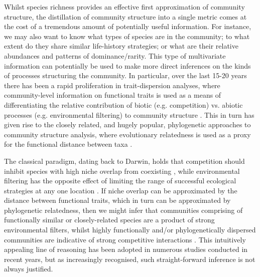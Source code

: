 Whilst species richness provides an effective first approximation of community structure, the distillation of community structure into a single metric comes at the cost of a tremendous amount of potentially useful information. For instance, we may also want to know what types of species are in the community; to what extent do they share similar life-history strategies; or what are their relative abundances and patterns of dominance/rarity. This type of multivariate information can potentially be used to make more direct inferences on the kinds of processes structuring the community. In particular, over the last 15-20 years there has been a rapid proliferation in trait-dispersion analyses, where community-level information on functional traits is used as a means of differentiating the relative contribution of biotic (e.g. competition) vs. abiotic processes (e.g. environmental filtering) to community structure \citep[e.g.][]{Weiher1995, Weiher1998, Cavender-Bares2004a, Cornwell2009, Kraft2010}. This in turn has given rise to the closely related, and hugely popular, phylogenetic approaches to community structure analysis, where evolutionary relatedness is used as a proxy for the functional distance between taxa \citep{Webb2000, Tofts2000, Slingsby2006, Cavender-Bares2006, Purschke2013}. 

The classical paradigm, dating back to Darwin, holds that competition should inhibit species with high niche overlap from coexisting \citep[limiting similarity \textit{sensu}][]{macarthur1967}, while environmental filtering has the opposite effect of limiting the range of successful ecological strategies at any one location \citep{Weiher1995,Diaz1998, Stubbs2004}. If niche overlap can be approximated by the distance between functional traits, which in turn can be approximated by phylogenetic relatedness, then we might infer that communities comprising of functionally similar or closely-related species are a product of strong environmental filters, whilst highly functionally and/or phylogenetically dispersed communities are indicative of strong competitive interactions \citep{Webb2000, Webb2002}. This intuitively appealing line of reasoning has been adopted in numerous studies conducted in recent years, but as increasingly recognised, such straight-forward inference is not always justified. 

